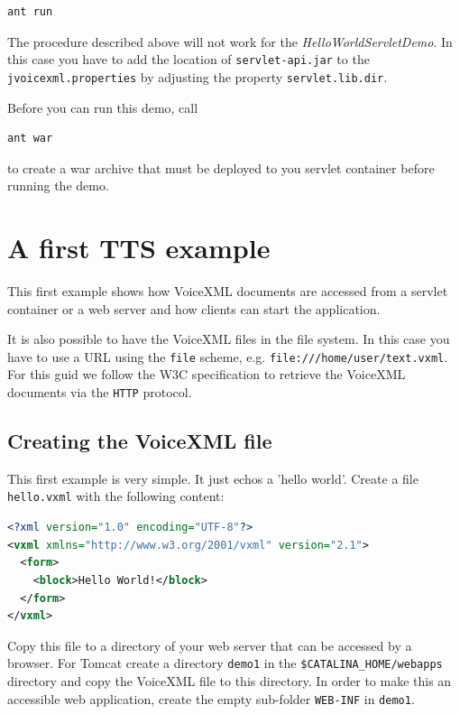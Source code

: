 \documentclass[11pt,a4paper]{article}
\begin{document}
\begin{lstlisting}
ant run
\end{lstlisting}

The procedure described above will not work for the
\emph{HelloWorldServletDemo}. In this case you have to add the location of
\texttt{servlet-api.jar} to the \texttt{jvoicexml.properties} by adjusting the
property \texttt{servlet.lib.dir}.

Before you can run this demo, call

\begin{lstlisting}
ant war
\end{lstlisting}

to create a war archive that must be deployed to you servlet container
before running the demo.

\section{A first TTS example}
\label{sec:first-tts-example}

This first example shows how VoiceXML documents are accessed from a
servlet container or a web server and how clients can start the application.

It is also possible to have the VoiceXML files in the file system. In this case
you have to use a URL using the \lstinline{file} scheme, e.g.
\lstinline{file:///home/user/text.vxml}. For this guid we follow the W3C
specification to retrieve the VoiceXML documents via the \lstinline{HTTP}
protocol.

\subsection{Creating the VoiceXML file}
\label{sec:hello-vxml}

This first example is very simple. It just echos a 'hello world'.
Create a file \texttt{hello.vxml} with the following content:

\begin{lstlisting}[language=XML]
<?xml version="1.0" encoding="UTF-8"?> 
<vxml xmlns="http://www.w3.org/2001/vxml" version="2.1">
  <form>
    <block>Hello World!</block>
  </form>
</vxml>
\end{lstlisting}

Copy this file to a directory of your web server that can be accessed
by a browser. For Tomcat create a directory \texttt{demo1} in
the \texttt{\$CATALINA\_HOME/web\-apps} directory and copy the VoiceXML
file to this directory. In order to make this
an accessible web application, create the empty sub-folder \texttt{WEB-INF}
in \texttt{demo1}.
\end{document}
